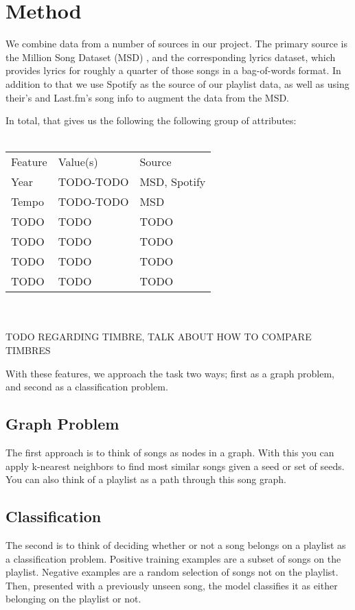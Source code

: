 \documentclass[10pt,journal,compsoc]{IEEEtran}
\begin{document}
\section{Method}
We combine data from a number of sources in our project. The primary source is the Million Song Dataset (MSD) \cite{msd}, and the corresponding lyrics dataset, which provides lyrics for roughly a quarter of those songs in a bag-of-words format. In addition to that we use Spotify \cite{spotify} as the source of our playlist data, as well as using their's and Last.fm's \cite{lastfm} song info to augment the data from the MSD.

In total, that gives us the following the following group of attributes:
\\\\
\begin{tabular}{lll}
Feature    & Value(s)       & Source          \\
Year       & TODO-TODO      & MSD, Spotify    \\
Tempo      & TODO-TODO      & MSD             \\
TODO       & TODO           & TODO            \\
TODO       & TODO           & TODO            \\
TODO       & TODO           & TODO            \\
TODO       & TODO           & TODO            \\
\end{tabular}
\\\\
TODO REGARDING TIMBRE, TALK ABOUT HOW TO COMPARE TIMBRES

With these features, we approach the task two ways; first as a graph problem, and second as a classification problem.

\subsection{Graph Problem}
The first approach is to think of songs as nodes in a graph. With this you can apply k-nearest neighbors to find most similar songs given a seed or set of seeds. You can also think of a playlist as a path through this song graph. \cite{Alghoniemy01anetwork}

\subsection{Classification}
The second is to think of deciding whether or not a song belongs on a playlist as a classification problem. Positive training examples are a subset of songs on the playlist. Negative examples are a random selection of songs not on the playlist. Then, presented with a previously unseen song, the model classifies it as either belonging on the playlist or not.
\end{document}

